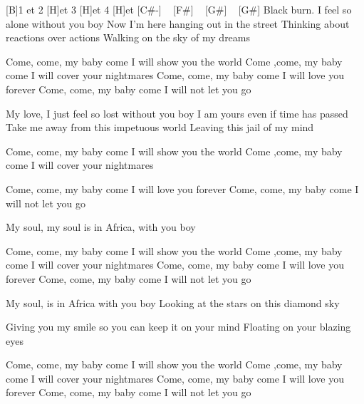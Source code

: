 [B]1 et 2 [H]et 3 [H]et 4 [H]et
[C#-] ~ [F#] ~ [G#] ~ [G#]
 Black burn. I feel so alone without you boy
Now I'm here hanging out in the street
Thinking about reactions over actions
Walking on the sky of my dreams


Come, come, my baby come
I will show you the world
Come ,come, my baby come
I will cover your nightmares
Come, come, my baby come
I will love you forever
Come, come, my baby come
I will not let you go

My love, I just feel so lost without you boy
I am yours even if time has passed
Take me away from this impetuous world
Leaving this jail of my mind

Come, come, my baby come
I will show you the world
Come ,come, my baby come
I will cover your nightmares

Come, come, my baby come
I will love you forever
Come, come, my baby come
I will not let you go

My soul, my soul is in Africa, with you boy

Come, come, my baby come
I will show you the world
Come ,come, my baby come
I will cover your nightmares
Come, come, my baby come
I will love you forever
Come, come, my baby come
I will not let you go

My soul, is in Africa with you boy
Looking at the stars on this diamond sky

Giving you my smile so you can keep it on your mind
Floating on your blazing eyes

Come, come, my baby come
I will show you the world
Come ,come, my baby come
I will cover your nightmares
Come, come, my baby come
I will love you forever
Come, come, my baby come
I will not let you go 